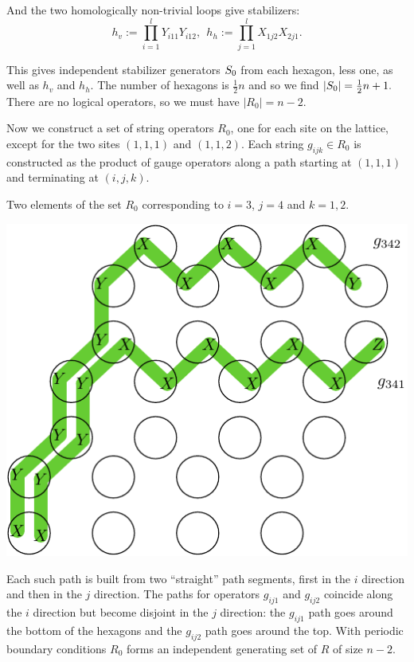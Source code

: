 And the two homologically non-trivial loops
give stabilizers:
$$
h_v := \prod_{i=1}^l Y_{i11} Y_{i12},\ \ 
h_h := \prod_{j=1}^l X_{1j2} X_{2j1}.
$$

This gives independent stabilizer generators $S_0$
from each hexagon, less one, as well as $h_v$ and $h_h.$
The number of hexagons is $\frac{1}{2}n$ and
so we find $|S_0|=\frac{1}{2} n+1.$
There are no logical operators, so we
must have $|R_0|=n-2.$


Now we construct a set of string operators $R_0$,
one for each site on the lattice, except for
the two sites $(1,1,1)$ and $(1,1,2).$
Each string $g_{ijk}\in R_0$
is constructed as the product of
gauge operators along a path starting at
$(1,1,1)$ and terminating at $(i,j,k).$

Two elements of the set $R_0$ corresponding
to $i=3$, $j=4$ and $k=1,2.$
\begin{center}
\includegraphics[width=0.5\columnwidth]{fig_01.pdf}
\end{center}

Each such path is built from two ``straight''
path segments, first in the $i$ direction
and then in the $j$ direction. 
The paths for operators $g_{ij1}$ and
$g_{ij2}$ coincide along the $i$ direction
but become disjoint in the $j$ direction:
the $g_{ij1}$ path goes around the bottom
of the hexagons and the $g_{ij2}$ path
goes around the top.
With periodic boundary conditions $R_0$ forms an
independent generating set of $R$ of size $n-2.$

